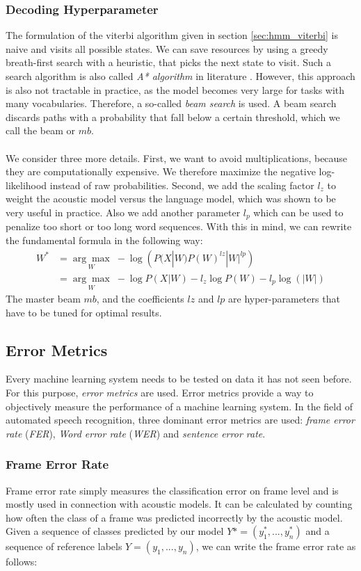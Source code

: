 \subsubsection{Decoding Hyperparameter}
\label{sec:hyperparams}
The formulation of the viterbi algorithm given in section \ref{sec:hmm_viterbi} is naive and visits all possible states. We can save resources by using a greedy breath-first search with a heuristic, that picks the next state to visit. Such a search algorithm is also called \textit{A* algorithm} in literature \cite{hart1968formal}. However, this approach is also not tractable in practice, as the model becomes very large for tasks with many vocabularies. Therefore, a so-called \textit{beam search} is used. A beam search discards paths with a probability that fall below a certain threshold, which we call the beam or $mb$. \\ \\
We consider three more details. First, we want to avoid multiplications, because they are computationally expensive. We therefore maximize the negative log-likelihood instead of raw probabilities. Second, we add the scaling factor $l_z$ to weight the acoustic model versus the language model, which was shown to be very useful in practice. Also we add another parameter $l_p$ which can be used to penalize too short or too long word sequences. With this in mind, we can rewrite the fundamental formula in the following way: 
\begin{align*}
W^* &= \underset{W}{\arg \max} \; -\log\left(P(X|W) P(W)^{lz} |W|^{lp} \right) \\
&= \underset{W}{\arg \max} \; -\log P(X|W) - l_z\log P(W) -l_p\log(|W|) 
\end{align*}
The master beam $mb$, and the coefficients $lz$ and $lp$ are hyper-parameters that have to be tuned for optimal results.

\subsection{Error Metrics}
Every machine learning system needs to be tested on data it has not seen before. For this purpose, \textit{error metrics} are used. Error metrics provide a way to objectively measure the performance of a machine learning system. In the field of automated speech recognition, three dominant error metrics are used: \textit{frame error rate} (\textit{FER}), \textit{Word error rate} (\textit{WER}) and \textit{sentence error rate}.

\subsubsection{Frame Error Rate}
Frame error rate simply measures the classification error on frame level and is mostly used in connection with acoustic models. It can be calculated by counting how often the class of a frame was predicted incorrectly by the acoustic model. Given a sequence of classes predicted by our model $Y* = (y^*_1, ..., y^*_n)$ and a sequence of reference labels $Y = (y_1, ..., y_n)$, we can write the frame error rate as follows:

